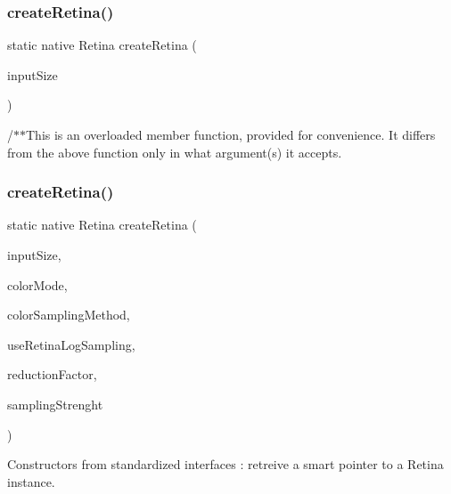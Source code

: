 \subsubsection{\texorpdfstring{create\+Retina()}{createRetina()}\hspace{0.1cm}{\footnotesize\ttfamily [1/2]}}
{\footnotesize\ttfamily static native Retina create\+Retina (\begin{DoxyParamCaption}\item[{@By\+Val Size}]{input\+Size }\end{DoxyParamCaption})\hspace{0.3cm}{\ttfamily [related]}}

/$\ast$$\ast$\+This is an overloaded member function, provided for convenience. It differs from the above function only in what argument(s) it accepts. \mbox{\label{group__bioinspired_ga050dd55b35ef6df434cb1ce7a98b7954}} 
\subsubsection{\texorpdfstring{create\+Retina()}{createRetina()}\hspace{0.1cm}{\footnotesize\ttfamily [2/2]}}
{\footnotesize\ttfamily static native Retina create\+Retina (\begin{DoxyParamCaption}\item[{@By\+Val Size}]{input\+Size,  }\item[{@Cast(\char`\"{}const bool\char`\"{}) boolean}]{color\+Mode,  }\item[{int}]{color\+Sampling\+Method,  }\item[{@Cast(\char`\"{}const bool\char`\"{}) boolean}]{use\+Retina\+Log\+Sampling,  }\item[{float}]{reduction\+Factor,  }\item[{float}]{sampling\+Strenght }\end{DoxyParamCaption})\hspace{0.3cm}{\ttfamily [related]}}



Constructors from standardized interfaces \+: retreive a smart pointer to a Retina instance. 


